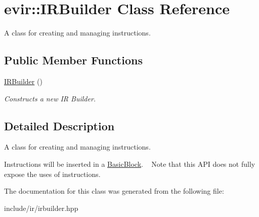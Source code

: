 \hypertarget{classevir_1_1IRBuilder}{}\section{evir\+:\+:I\+R\+Builder Class Reference}
\label{classevir_1_1IRBuilder}


A class for creating and managing instructions.  


\subsection*{Public Member Functions}
\begin{DoxyCompactItemize}
\item 
\mbox{\label{classevir_1_1IRBuilder_a3d72af25adcae919d694d7bd4017e9ed}} 
\hyperlink{classevir_1_1IRBuilder_a3d72af25adcae919d694d7bd4017e9ed}{I\+R\+Builder} ()
\begin{DoxyCompactList}\small\item\em Constructs a new IR Builder. \end{DoxyCompactList}\end{DoxyCompactItemize}


\subsection{Detailed Description}
A class for creating and managing instructions. 

Instructions will be inserted in a \hyperlink{}{Basic\+Block}. ~\newline
Note that this A\+PI does not fully expose the uses of instructions. 

The documentation for this class was generated from the following file\+:\begin{DoxyCompactItemize}
\item 
include/ir/irbuilder.\+hpp\end{DoxyCompactItemize}
